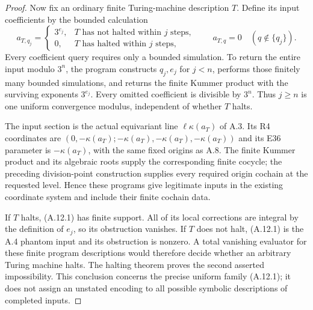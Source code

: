 \begin{proof}
Now fix an ordinary finite Turing-machine description $T$.
Define its input coefficients by the bounded calculation
\[
 a_{T,q_j}=
 \begin{cases}
  3^{e_j},&T\text{ has not halted within }j\text{ steps},\\
  0,&T\text{ has halted within }j\text{ steps},
 \end{cases}
 \qquad a_{T,q}=0\quad(q\notin\{q_j\}).
 \tag{A.12.1}
\]
Every coefficient query requires only a bounded simulation.
To return the entire input modulo $3^n$, the program
constructs $q_j,e_j$ for $j<n$, performs those finitely
many bounded simulations, and returns the finite Kummer
product with the surviving exponents $3^{e_j}$.
Every omitted coefficient is divisible by $3^n$.
Thus $j\ge n$ is one uniform convergence modulus,
independent of whether $T$ halts.

The input section is the actual equivariant line
$\ell\kappa(a_T)$ of A.3. Its R4 coordinates are
$(0,-\kappa(a_T);-\kappa(a_T),-\kappa(a_T),-\kappa(a_T))$
and its E36 parameter is $-\kappa(a_T)$, with the
same fixed origins as A.8. The finite Kummer product
and its algebraic roots supply the corresponding
finite cocycle; the preceding division-point
construction supplies every required origin
cochain at the requested level. Hence these
programs give legitimate inputs in the existing
coordinate system and include their finite
cochain data.

If $T$ halts, (A.12.1) has finite support.
All of its local corrections are integral by
the definition of $e_j$, so its obstruction
vanishes. If $T$ does not halt, (A.12.1) is
the A.4 phantom input and its obstruction
is nonzero. A total vanishing evaluator for
these finite program descriptions would
therefore decide whether an arbitrary
Turing machine halts. The halting theorem
proves the second asserted impossibility.
This conclusion concerns the precise
uniform family (A.12.1); it does not assign
an unstated encoding to all possible
symbolic descriptions of completed inputs.
\end{proof}

